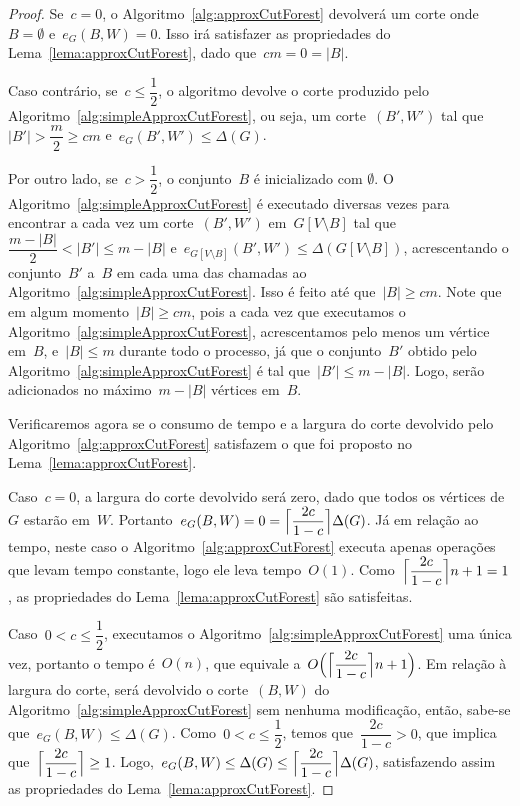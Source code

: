 \begin{proof}
	Se~$c=0$, o Algoritmo~\ref{alg:approxCutForest} devolverá
	um corte onde~$B=\emptyset$ e~$e_G(B,W) = 0$. 
	Isso irá satisfazer as 
	propriedades do Lema~\ref{lema:approxCutForest}, dado 
	que~$cm=0=|B|$.

	Caso contrário, se~$c \le \dfrac{1}{2}$, o algoritmo 
	devolve o corte produzido pelo 
	Algoritmo~\ref{alg:simpleApproxCutForest}, ou seja,
	um corte~$(B',W')$ tal 
	que~$|B'|>\dfrac{m}{2}\ge cm$ e~${e_G(B',W')\le \Delta(G)}$.

	Por outro lado, se~$c>\dfrac{1}{2}$, 
	o conjunto~$B$ é inicializado com $\emptyset$.
	O Algoritmo~\ref{alg:simpleApproxCutForest} é
	executado diversas vezes para encontrar a cada vez
	um corte~$(B',W')$ em~${G[V\setminus B]}$ 
	tal que~${\dfrac{m-|B|}{2}<|B'|\le m-|B|}$ 
	e~${e_{G[V\setminus B]}(B',W')\le\Delta(G[V\setminus B])}$, 
	acrescentando o 
	conjunto~$B'$ a~$B$ em cada uma das chamadas ao 
	Algoritmo~\ref{alg:simpleApproxCutForest}.
	Isso é feito até que~${|B|\ge cm}$.
	Note que em algum momento~$|B|\ge cm$, pois a 
	cada vez que executamos o 
	Algoritmo~\ref{alg:simpleApproxCutForest}, acrescentamos pelo 
	menos um vértice em~$B$, 
	e~${|B|\le m}$ durante todo o processo, já que o
	conjunto~$B'$ obtido 
	pelo Algoritmo~\ref{alg:simpleApproxCutForest} 
	é tal que~$|B'|\le m-|B|$. Logo, serão adicionados no 
	máximo~${m-|B|}$ vértices em~$B$.
	
	\bigskip
	
	Verificaremos agora se o consumo de tempo e a largura do corte
	devolvido pelo Algoritmo~\ref{alg:approxCutForest} satisfazem
	o que foi proposto no Lema~\ref{lema:approxCutForest}.
	
	Caso~${c=0}$, a largura do corte devolvido será zero,
	dado que todos os vértices de~$G$ estarão em~$W$.
	Portanto~${e_G(B,W)=0=\ceil[\Big]{\dfrac{2c}{1-c}} \Delta(G)}$.
	Já em relação ao tempo, neste caso o Algoritmo~\ref{alg:approxCutForest}
	executa apenas operações que levam tempo constante, logo ele
	leva tempo~$O(1)$. 
	Como~$\ceil[\Big]{\dfrac{2c}{1-c}} n+1 = 1$,
	as propriedades do Lema~\ref{lema:approxCutForest} são
	satisfeitas.

	Caso~$0<c\le \dfrac{1}{2}$, executamos o
	Algoritmo~\ref{alg:simpleApproxCutForest} uma única vez, 
	portanto o tempo é~$O(n)$, que equivale 
	a~${O\Big(\ceil[\Big]{\dfrac{2c}{1-c}} n+1\Big)}$.
	Em relação à largura do corte, será devolvido o corte~$(B,W)$ do 
	Algoritmo~\ref{alg:simpleApproxCutForest} sem nenhuma 
	modificação, então, sabe-se que~${e_G(B,W)\le \Delta(G)}$.
	Como~${0<c\le\dfrac{1}{2}}$, temos que~${\dfrac{2c}{1-c}>0}$, 
	que implica que~${\ceil[\Big]{ \dfrac{2c}{1-c}}\ge 1}$.
	Logo,~${e_G(B,W)\le\Delta(G)\le \ceil[\Big]{\dfrac{2c}{1-c}}
	\Delta(G)}$, 
	satisfazendo assim as propriedades do 
	Lema~\ref{lema:approxCutForest}.


\end{proof}
